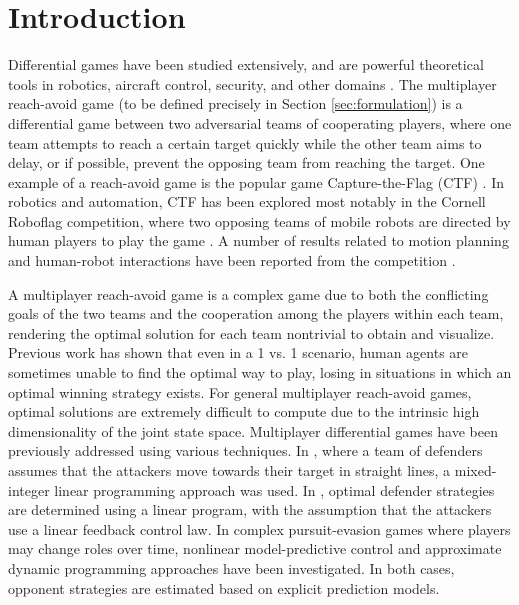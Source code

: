 \section{Introduction}
\label{sec:intro}
Differential games have been studied extensively, and are powerful theoretical tools in robotics, aircraft control, security, and other domains \cite{OFTHEAIRFORCEWASHINGTON:2009p37, Erzberger:2006p44, kiva2009}. The multiplayer reach-avoid game (to be defined precisely in Section \ref{sec:formulation}) is a differential game between two adversarial teams of cooperating players, where one team attempts to reach a certain target quickly while the other team aims to delay, or if possible, prevent the opposing team from reaching the target. One example of a reach-avoid game is the popular game Capture-the-Flag (CTF) \cite{HThesis, Huang2011}. In robotics and automation, CTF has been explored most notably in the Cornell Roboflag competition, where two opposing teams of mobile robots are directed by human players to play the game \cite{DAndrea:2003p95}. A number of results related to motion planning and human-robot interactions have been reported from the competition \cite{Earl:2007p101, Campbell:2003p5, Waydo:2003p97, Parasuraman:2005p99}. 

A multiplayer reach-avoid game is a complex game due to both the conflicting goals of the two teams and the cooperation among the players within each team, rendering the optimal solution for each team nontrivial to obtain and visualize. Previous work \cite{HThesis, Huang2011} has shown that even in a 1 vs. 1 scenario, human agents are sometimes unable to find the optimal way to play, losing in situations in which an optimal winning strategy exists. For general multiplayer reach-avoid games, optimal solutions are extremely difficult to compute due to the intrinsic high dimensionality of the joint state space. Multiplayer differential games have been previously addressed using various techniques. In \cite{Earl:2007p101}, where a team of defenders assumes that the attackers move towards their target in straight lines, a mixed-integer linear programming approach was used. In \cite{Chasparis:2005p102}, optimal defender strategies are determined using a linear program, with the assumption that the attackers use a linear feedback control law. In complex pursuit-evasion games where players may change roles over time, nonlinear model-predictive control \cite{Sprinkle:2004p100} and approximate dynamic programming \cite{McGrew:2008p103} approaches have been investigated. In both cases, opponent strategies are estimated based on explicit prediction models.

